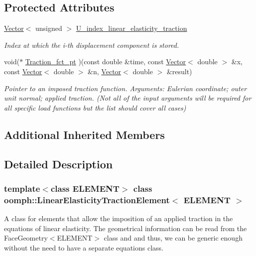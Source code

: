 \subsection*{Protected Attributes}
\begin{DoxyCompactItemize}
\item 
\hyperlink{classoomph_1_1Vector}{Vector}$<$ unsigned $>$ \hyperlink{classoomph_1_1LinearElasticityTractionElement_ad3a514b2ac65ab9cba87192ec274bc45}{U\+\_\+index\+\_\+linear\+\_\+elasticity\+\_\+traction}
\begin{DoxyCompactList}\small\item\em Index at which the i-\/th displacement component is stored. \end{DoxyCompactList}\item 
void($\ast$ \hyperlink{classoomph_1_1LinearElasticityTractionElement_a6a7b937fe5bae53dd6cd8d7c1f336c4f}{Traction\+\_\+fct\+\_\+pt} )(const double \&time, const \hyperlink{classoomph_1_1Vector}{Vector}$<$ double $>$ \&x, const \hyperlink{classoomph_1_1Vector}{Vector}$<$ double $>$ \&n, \hyperlink{classoomph_1_1Vector}{Vector}$<$ double $>$ \&result)
\begin{DoxyCompactList}\small\item\em Pointer to an imposed traction function. Arguments\+: Eulerian coordinate; outer unit normal; applied traction. (Not all of the input arguments will be required for all specific load functions but the list should cover all cases) \end{DoxyCompactList}\end{DoxyCompactItemize}
\subsection*{Additional Inherited Members}


\subsection{Detailed Description}
\subsubsection*{template$<$class E\+L\+E\+M\+E\+NT$>$\newline
class oomph\+::\+Linear\+Elasticity\+Traction\+Element$<$ E\+L\+E\+M\+E\+N\+T $>$}

A class for elements that allow the imposition of an applied traction in the equations of linear elasticity. The geometrical information can be read from the Face\+Geometry$<$\+E\+L\+E\+M\+E\+N\+T$>$ class and and thus, we can be generic enough without the need to have a separate equations class. 

